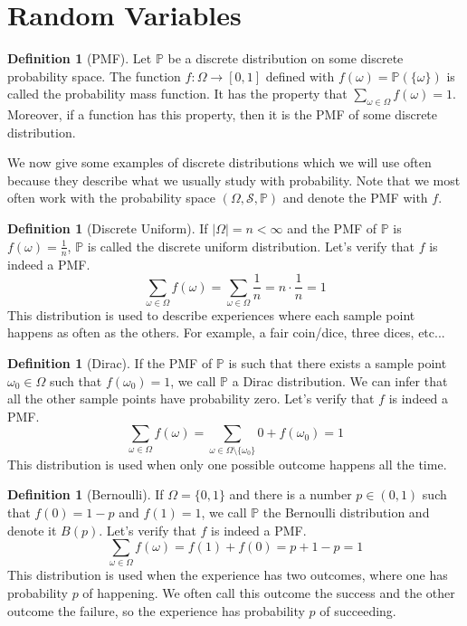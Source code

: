 \documentclass[paper=a4, fontsize=12pt]{scrartcl} %
\theoremstyle{definition}
\newtheorem{defn}[thm]{Definition}
\theoremstyle{remark}
\newcommand{\mS}{\mathcal{S}}
\renewcommand{\P}{\mathbb{P}}
\numberwithin{equation}{section} %
\numberwithin{figure}{section} %
\numberwithin{table}{section} %
\begin{document}
\section{Random Variables}
\begin{defn}[PMF]
	Let $\P$ be a discrete distribution on some discrete probability space. The function $f : \Omega \rightarrow [0,1]$ defined with $f(\omega) = \P(\{\omega\})$ is called the probability mass function. It has the property that $\sum_{\omega \in \Omega} f(\omega) = 1$. Moreover, if a function has this property, then it is the PMF of some discrete distribution.
\end{defn}
We now give some examples of discrete distributions which we will use often because they describe what we usually study with probability. Note that we most often work with the probability space $(\Omega, \mS, \P)$ and denote the PMF with $f$.
\begin{defn}[Discrete Uniform]
	If $|\Omega| = n < \infty$ and the PMF of $\P$ is $f(\omega) = \frac{1}{n}$, $\P$ is called the discrete uniform distribution. Let's verify that $f$ is indeed a PMF.
	\[ \sum_{\omega \in \Omega} f(\omega) = \sum_{\omega \in \Omega} \frac{1}{n} = n \cdot \frac{1}{n} = 1\]
	This distribution is used to describe experiences where each sample point happens as often as the others. For example, a fair coin/dice, three dices, etc...
\end{defn}
\begin{defn}[Dirac]
	If the PMF of $\P$ is such that there exists a sample point $\omega_0 \in \Omega$ such that $f(\omega_0) = 1$, we call $\P$ a Dirac distribution. We can infer that all the other sample points have probability zero. Let's verify that $f$ is indeed a PMF.
	\[ \sum_{\omega \in \Omega} f(\omega) = \sum_{\omega \in \Omega \setminus\{\omega_0\}}0 + f(\omega_0) = 1 \]
	This distribution is used when only one possible outcome happens all the time.
\end{defn}
\begin{defn}[Bernoulli]
	If $\Omega = \{0,1\}$ and there is a number $p \in (0,1)$ such that $f(0) = 1-p$ and $f(1) = 1$, we call $\P$ the Bernoulli distribution and denote it $B(p)$. Let's verify that $f$ is indeed a PMF.
	\[\sum_{\omega \in \Omega}f(\omega) = f(1) + f(0) = p+ 1-p = 1\]
	This distribution is used when the experience has two outcomes, where one has probability $p$ of happening. We often call this outcome the success and the other outcome the failure, so the experience has probability $p$ of succeeding.
\end{defn}
\end{document}
